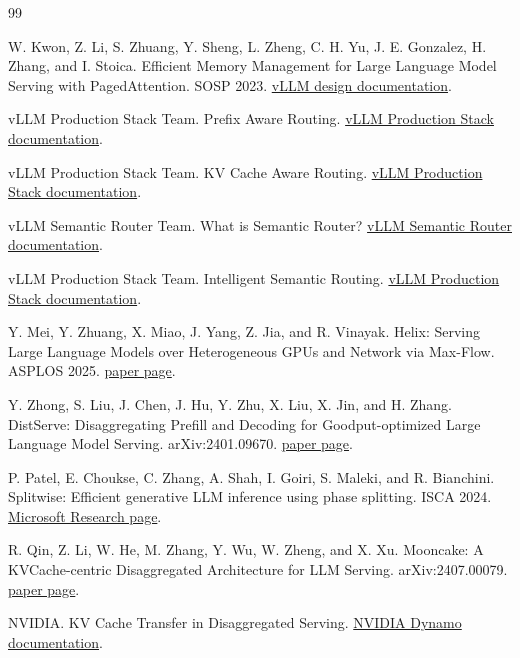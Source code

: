 \documentclass[10pt,twocolumn]{article}
\begin{document}
\begin{thebibliography}{99}

W. Kwon, Z. Li, S. Zhuang, Y. Sheng, L. Zheng, C. H. Yu, J. E. Gonzalez, H. Zhang, and I. Stoica.
\newblock Efficient Memory Management for Large Language Model Serving with PagedAttention.
\newblock SOSP 2023. \href{https://docs.vllm.ai/en/stable/design/paged_attention/}{vLLM design documentation}.

vLLM Production Stack Team.
\newblock Prefix Aware Routing.
\newblock \href{https://docs.vllm.ai/projects/production-stack/en/latest/use_cases/prefix-aware-routing.html}{vLLM Production Stack documentation}.

vLLM Production Stack Team.
\newblock KV Cache Aware Routing.
\newblock \href{https://docs.vllm.ai/projects/production-stack/en/latest/use_cases/kv-cache-aware-routing.html}{vLLM Production Stack documentation}.

vLLM Semantic Router Team.
\newblock What is Semantic Router?
\newblock \href{https://vllm-semantic-router.com/docs/v0.1/overview/semantic-router-overview}{vLLM Semantic Router documentation}.

vLLM Production Stack Team.
\newblock Intelligent Semantic Routing.
\newblock \href{https://docs.vllm.ai/projects/production-stack/en/latest/use_cases/semantic-router-integration.html}{vLLM Production Stack documentation}.

Y. Mei, Y. Zhuang, X. Miao, J. Yang, Z. Jia, and R. Vinayak.
\newblock Helix: Serving Large Language Models over Heterogeneous GPUs and Network via Max-Flow.
\newblock ASPLOS 2025. \href{https://www.pdl.cmu.edu/PDL-FTP/BigLearning/helix_abs.shtml}{paper page}.

Y. Zhong, S. Liu, J. Chen, J. Hu, Y. Zhu, X. Liu, X. Jin, and H. Zhang.
\newblock DistServe: Disaggregating Prefill and Decoding for Goodput-optimized Large Language Model Serving.
\newblock arXiv:2401.09670. \href{https://huggingface.co/papers/2401.09670}{paper page}.

P. Patel, E. Choukse, C. Zhang, A. Shah, I. Goiri, S. Maleki, and R. Bianchini.
\newblock Splitwise: Efficient generative LLM inference using phase splitting.
\newblock ISCA 2024. \href{https://www.microsoft.com/en-us/research/publication/splitwise-efficient-generative-llm-inference-using-phase-splitting/}{Microsoft Research page}.

R. Qin, Z. Li, W. He, M. Zhang, Y. Wu, W. Zheng, and X. Xu.
\newblock Mooncake: A KVCache-centric Disaggregated Architecture for LLM Serving.
\newblock arXiv:2407.00079. \href{https://huggingface.co/papers/2407.00079}{paper page}.

NVIDIA.
\newblock KV Cache Transfer in Disaggregated Serving.
\newblock \href{https://docs.nvidia.com/dynamo/latest/components/backends/trtllm/kv-cache-tranfer.html}{NVIDIA Dynamo documentation}.

\end{thebibliography}
\end{document}
